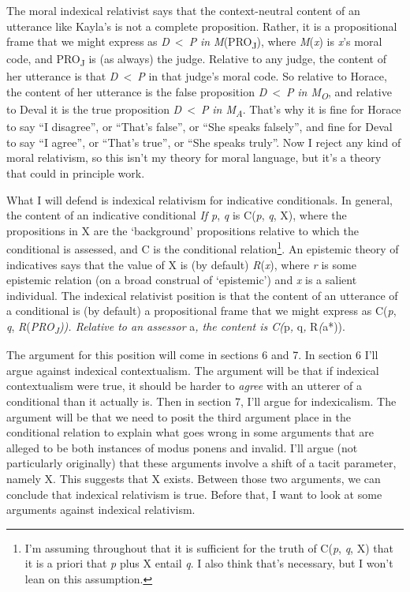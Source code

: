 \documentclass[
  11pt,
  letterpaper,
  DIV=11,
  numbers=noendperiod,
  twoside]{scrartcl}
\begin{document}
The moral indexical relativist says that the context-neutral content of
an utterance like Kayla's is not a complete proposition. Rather, it is a
propositional frame that we might express as \emph{D}~\textless~\emph{P}
\emph{in M}(PRO\textsubscript{J}), where \emph{M}(\emph{x}) is
\emph{x}'s moral code, and PRO\textsubscript{J} is (as always) the
judge. Relative to any judge, the content of her utterance is that
\emph{D}~\textless~\emph{P} in that judge's moral code. So relative to
Horace, the content of her utterance is the false proposition
\emph{D}~\textless~\emph{P} \emph{in M\textsubscript{O}}, and relative
to Deval it is the true proposition \emph{D}~\textless~\emph{P} \emph{in
M\textsubscript{A}}. That's why it is fine for Horace to say ``I
disagree'', or ``That's false'', or ``She speaks falsely'', and fine for
Deval to say ``I agree'', or ``That's true'', or ``She speaks truly''.
Now I reject any kind of moral relativism, so this isn't my theory for
moral language, but it's a theory that could in principle work.

What I will defend is indexical relativism for indicative conditionals.
In general, the content of an indicative conditional \emph{If p},
\emph{q} is C(\emph{p}, \emph{q}, X), where the propositions in X are
the `background' propositions relative to which the conditional is
assessed, and C is the conditional relation\footnote{I'm assuming
  throughout that it is sufficient for the truth of C(\emph{p},
  \emph{q}, X) that it is a priori that \emph{p} plus X entail \emph{q}.
  I also think that's necessary, but I won't lean on this assumption.}.
An epistemic theory of indicatives says that the value of X is (by
default) \emph{R}(\emph{x}), where \emph{r} is some epistemic relation
(on a broad construal of `epistemic') and \emph{x} is a salient
individual. The indexical relativist position is that the content of an
utterance of a conditional is (by default) a propositional frame that we
might express as C(\emph{p}, \emph{q},
\emph{R}(\emph{PRO\textsubscript{J})). Relative to an assessor }a\emph{,
the content is C(}p\emph{, }q\emph{, }R\emph{(}a*)).

The argument for this position will come in sections 6 and 7. In section
6 I'll argue against indexical contextualism. The argument will be that
if indexical contextualism were true, it should be harder to
\emph{agree} with an utterer of a conditional than it actually is. Then
in section 7, I'll argue for indexicalism. The argument will be that we
need to posit the third argument place in the conditional relation to
explain what goes wrong in some arguments that are alleged to be both
instances of modus ponens and invalid. I'll argue (not particularly
originally) that these arguments involve a shift of a tacit parameter,
namely X. This suggests that X exists. Between those two arguments, we
can conclude that indexical relativism is true. Before that, I want to
look at some arguments against indexical relativism.
\end{document}
